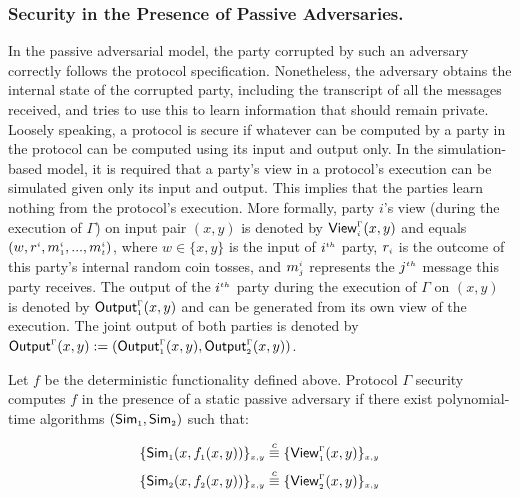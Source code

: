  \subsubsection{Security in the Presence of Passive Adversaries.}  In the passive adversarial model, the party corrupted by such an adversary correctly follows the protocol specification. Nonetheless, the adversary obtains the internal state of the corrupted party, including the transcript of all the messages received, and tries to use this to learn information that should remain private. Loosely speaking, a protocol is secure if whatever can be computed by a party in the protocol can be computed using its input and output only. In the simulation-based model, it is required that a party’s view in a protocol's 
 execution can be simulated given only its input and output. This implies that the parties learn nothing from the protocol's execution. More formally, party $i$’s view (during the execution of $\Gamma$) on input pair  $(x, y)$ is denoted by $\mathsf{View}_{\scriptscriptstyle i}^{\scriptscriptstyle \Gamma}(x,y)$ and equals $(w, r^{\scriptscriptstyle i}, m_{\scriptscriptstyle 1}^{\scriptscriptstyle i}, ..., m_{\scriptscriptstyle t}^{\scriptscriptstyle i})$, where $w\in\{x,y\}$ is the input of $i^{\scriptscriptstyle th}$ party, $r_{\scriptscriptstyle i}$ is the outcome of this party's internal random coin tosses, and $m_{\scriptscriptstyle j}^{\scriptscriptstyle i}$ represents the $j^{\scriptscriptstyle th}$ message this party receives.  The output of the $i^{\scriptscriptstyle th}$ party during the execution of $\Gamma$ on $(x, y)$ is denoted by $\mathsf{Output}_{\scriptscriptstyle 1}^{\scriptscriptstyle \Gamma}(x,y)$ and can be generated from its own view of the execution.  The joint output of both parties is denoted by $\mathsf{Output}^{\scriptscriptstyle \Gamma}(x,y):=(\mathsf{Output}_{\scriptscriptstyle 1}^{\scriptscriptstyle \Gamma}(x,y), \mathsf{Output}_{\scriptscriptstyle 2}^{\scriptscriptstyle \Gamma}(x,y))$.

\begin{definition}
Let $f$ be the deterministic functionality defined above. Protocol $\Gamma$ security computes $f$ in the presence of a static  passive adversary if there exist polynomial-time algorithms $(\mathsf {Sim}_{\scriptscriptstyle 1}, \mathsf {Sim}_{\scriptscriptstyle 2})$ such that:
\end{definition}
%
  \begin{equation*}
  \{\mathsf {Sim}_{\scriptscriptstyle 1}(x,f_{\scriptscriptstyle 1}(x,y))\}_{\scriptscriptstyle x,y}\stackrel{c}{\equiv} \{\mathsf{View}_{\scriptscriptstyle 1}^{\scriptscriptstyle \Gamma}(x,y) \}_{\scriptscriptstyle x,y}\\
  \end{equation*}
  \begin{equation*}
    \{\mathsf{Sim}_{\scriptscriptstyle 2}(x,f_{\scriptscriptstyle 2}(x,y))\}_{\scriptscriptstyle x,y}\stackrel{c}{\equiv} \{\mathsf{View}_{\scriptscriptstyle 2}^{\scriptscriptstyle \Gamma}(x,y) \}_{\scriptscriptstyle x,y}
  \end{equation*}
  

